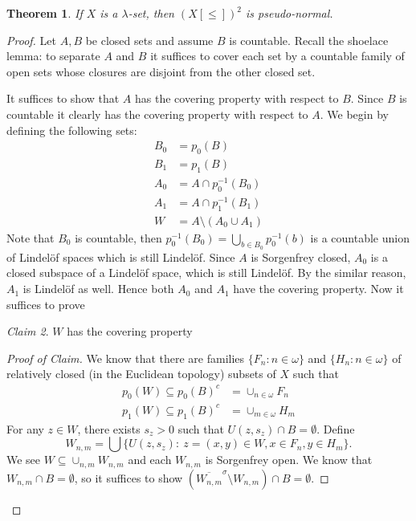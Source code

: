 \documentclass[11pt]{amsart}
\newtheorem{theorem}{Theorem}[section]
\theoremstyle{definition}
\theoremstyle{remark}
\newtheorem{claim}[theorem]{Claim}
\theoremstyle{plain}
\begin{document}
\begin{theorem}
    If $X$ is a $\lambda$-set, then $(X[\leq])^2$ is pseudo-normal.
\end{theorem}
\begin{proof}
    Let $A,B$ be closed sets and assume $B$ is countable. 
    Recall the shoelace lemma: to separate $A$ and $B$ it suffices to cover each set by a countable family of open sets whose closures are disjoint from the other closed set.
    
    It suffices to show that $A$ has the covering property with respect to $B$. Since $B$ is countable it clearly has the covering property with respect to $A$.
    We begin by defining the following sets:
    \begin{align*}
        B_0&= p_0(B)\\
        B_1&=p_1(B)\\
        A_0&= A\cap p_0^{-1}(B_0)\\
        A_1&= A\cap p_1^{-1}(B_1)\\
        W&= A\setminus(A_0\cup A_1)
    \end{align*}
    Note that $B_0$ is countable, then $p_0^{-1}(B_0)= \bigcup_{b\in B_0} p_0^{-1}(b) $ is a countable union of Lindel\"of spaces which is still Lindel\"of. Since $A$ is Sorgenfrey closed, $A_0$ is a closed subspace of a Lindel\"of space, which is still Lindel\"of. By the similar reason, $A_1$ is Lindel\"of as well. Hence both $A_0$ and $A_1$ have the covering property. Now it suffices to prove 
    \begin{claim}
        $W$ has the covering property
    \end{claim}
    \begin{proof}[Proof of Claim]
        We know that there are families $\{F_n:n\in \omega\}$ and $\{H_n:n\in \omega\}$ of relatively closed (in the Euclidean topology) subsets of $X$ such that 
        \begin{align*}
            p_0(W)\subseteq p_0(B)^c &= \cup_{n\in \omega} F_n\\
            p_1(W)\subseteq p_1(B)^c &= \cup_{m\in\omega} H_m
        \end{align*}
        For any $z\in W$, there exists $s_z>0$ such that $U(z,s_z)\cap B=\emptyset$. 
        Define $$W_{n,m}=\bigcup\{U(z,s_z):\ z=(x,y)\in W, x\in F_n,y\in H_m\}.$$
        We see $W\subseteq\cup_{n,m} W_{n,m}$ and each $W_{n,m}$ is Sorgenfrey open. We know that $W_{n,m}\cap B=\emptyset$, so it suffices to show $(\overline{W_{n,m}}^\sigma\setminus W_{n,m})\cap B=\emptyset$. 
        

\end{proof}
\end{proof}
\end{document}
